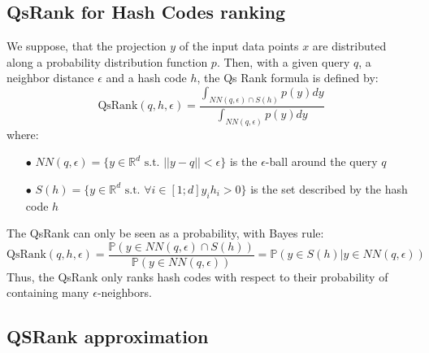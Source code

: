 \documentclass{article}
\newcommand{\RR}{\mathbb{R}}
\newcommand{\qr}{\textrm{QsRank}}
\begin{document}
\subsection{QsRank for Hash Codes ranking}

We suppose, that the projection $y$ of the input data points $x$ are distributed along a probability distribution function $p$. Then, with a given query $q$, a neighbor distance $\epsilon$ and a hash code $h$, the Qs Rank formula is defined by:
\[
	\qr(q, h, \epsilon) = \frac{\int_{NN(q,\epsilon) \cap S(h)} p(y) dy}{\int_{NN(q,\epsilon)} p(y) dy}
\]
where:
\begin{enumerate}
	\item[$\bullet$]$NN(q,\epsilon) = \{y \in \RR^d \text{ s.t. } ||y-q||<\epsilon\}$ is the $\epsilon$-ball around the query $q$
	\item[$\bullet$]$S(h) = \{y \in \RR^d \text{ s.t. } \forall i \in [1;d] y_i h_i > 0 \}$ is the set described by the hash code $h$
\end{enumerate}

The QsRank can only be seen as a probability, with Bayes rule:
\[
	\qr(q, h, \epsilon) = \frac{\mathbb{P}(y\in NN(q,\epsilon) \cap S(h))}{\mathbb{P}(y\in NN(q,\epsilon))} = \mathbb{P}(y \in S(h) | y\in NN(q,\epsilon))
\]
Thus, the QsRank only ranks hash codes with respect to their probability of containing many $\epsilon$-neighbors.

\subsection{QSRank approximation}
\end{document}
